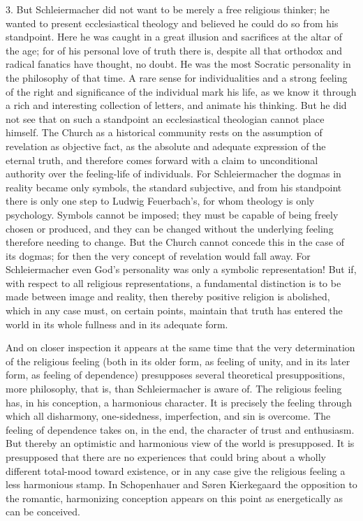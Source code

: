 \documentclass[12pt,a4paper]{book}
\newcommand{\opage}[1]{\marginnote{\footnotesize\textit{[#1]}}}
\begin{document}
3. But Schleiermacher did not want to be merely a free
religious thinker; he wanted to present ecclesiastical theology and
believed he could do so from his standpoint. Here he was caught in a
great illusion and sacrifices at the altar of the age; for of his
personal love of truth there is, despite all that orthodox and radical
fanatics have thought, no doubt. He was the most Socratic personality in
the philosophy of that time. A rare sense for individualities and a
strong feeling of the right and significance of the individual mark his
life, as we know it through a rich and interesting collection of letters,
and animate his thinking. But he did not see that on such a standpoint an
ecclesiastical theologian cannot place himself. The Church as a
historical community rests on the assumption of revelation as objective
fact, as the absolute and adequate expression of the eternal truth, and
therefore comes forward with a claim to unconditional authority over the
feeling-life of individuals. For Schleiermacher the dogmas in reality
became only symbols, the standard subjective, and from his standpoint
there is only one step to Ludwig Feuerbach's, for whom theology is only
psychology. Symbols cannot be imposed; they must be capable of being
freely chosen or produced, and they can be changed without the underlying
feeling therefore
\opage{9}needing to change. But the Church cannot concede this in the
case of its dogmas; for then the very concept of revelation would fall
away. For Schleiermacher even God's personality was only a symbolic
representation! But if, with respect to all religious representations, a
fundamental distinction is to be made between image and reality, then
thereby positive religion is abolished, which in any case must, on
certain points, maintain that truth has entered the world in its whole
fullness and in its adequate form.

And on closer inspection it appears at the same time that the very
determination of the religious feeling (both in its older form, as
feeling of unity, and in its later form, as feeling of dependence)
presupposes several theoretical presuppositions, more philosophy, that
is, than Schleiermacher is aware of. The religious feeling has, in his
conception, a harmonious character. It is precisely the feeling through
which all disharmony, one-sidedness, imperfection, and sin is overcome.
The feeling of dependence takes on, in the end, the character of trust
and enthusiasm. But thereby an optimistic and harmonious view of the
world is presupposed. It is presupposed that there are no experiences
that could bring about a wholly different total-mood toward existence, or
in any case give the religious feeling a less harmonious stamp. In
Schopenhauer and Søren Kierkegaard the opposition to the romantic,
harmonizing conception appears on this point as energetically as can be
conceived.
\end{document}
